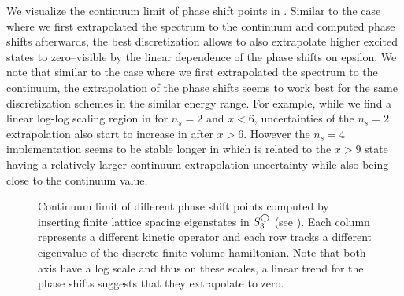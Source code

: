 We visualize the continuum limit of phase shift points in .
Similar to the case where we first extrapolated the spectrum to the continuum and computed phase shifts afterwards, the best discretization allows to also extrapolate higher excited states to zero--visible by the linear dependence of the phase shifts on epsilon.
We note that similar to the case where we first extrapolated the spectrum to the continuum, the extrapolation of the phase shifts seems to work best for the same discretization schemes in the similar energy range.
For example, while we find a linear log-log scaling region in  for $n_s = 2$ and $x<6$, uncertainties of the $n_s =2$ extrapolation also start to increase in  after $x>6$.
However the $n_s = 4$ implementation seems to be stable longer in  which is related to the $x>9$ state having a relatively larger continuum extrapolation uncertainty while also being close to the continuum value.


\begin{figure}[th]
    \scalebox{1.0}{}
    \caption{
        \label{fig:iv-continuum}
        Continuum limit of different phase shift points computed by inserting finite lattice spacing eigenstates in $S^{\bigcirc}_3$ (see ).
        Each column represents a different kinetic operator and each row tracks a different eigenvalue of the discrete finite-volume hamiltonian.
        Note that both axis have a log scale and thus on these scales, a linear trend for the phase shifts suggests that they extrapolate to zero.
    }
\end{figure}
